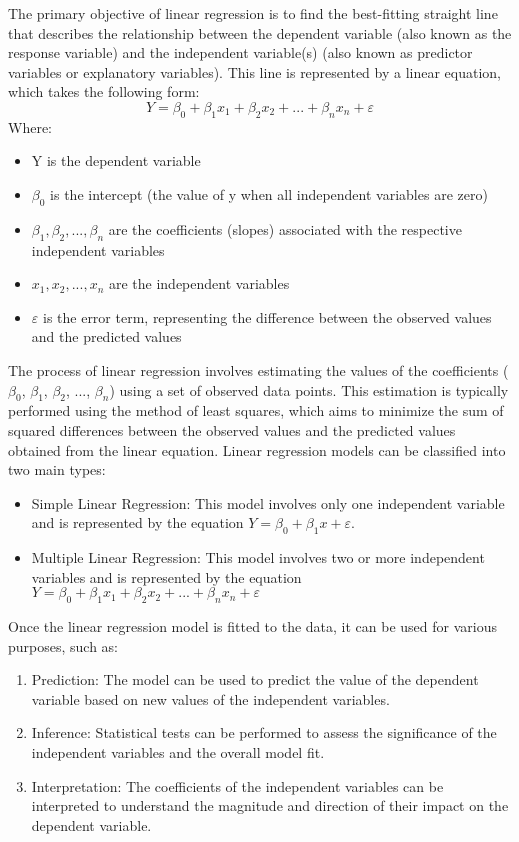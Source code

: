 The primary objective of linear regression is to find the best-fitting straight line that describes the relationship between the dependent variable (also known as the response variable) and the independent variable(s) (also known as predictor variables or explanatory variables). This line is represented by a linear equation, which takes the following form:
$$ Y = \beta_0 + \beta_1x_1 + \beta_2x_2 + ... + \beta_nx_n + \varepsilon  $$
Where:
\begin{itemize}
    \item Y is the dependent variable
    \item $ \beta_0 $ is the intercept (the value of y when all independent variables are zero)
    \item $ \beta_1,  \beta_2, ...,  \beta_n$ are the coefficients (slopes) associated with the respective independent variables
    \item $x_1, x_2, ..., x_n$ are the independent variables
    \item $\varepsilon$ is the error term, representing the difference between the observed values and the predicted values
\end{itemize}

\vspace*{1cm}

The process of linear regression involves estimating the values of the coefficients ($\beta_0$, $\beta_1$, $\beta_2$, ..., $\beta_n$) using a set of observed data points. This estimation is typically performed using the method of least squares, which aims to minimize the sum of squared differences between the observed values and the predicted values obtained from the linear equation.
Linear regression models can be classified into two main types:

\begin{itemize}
    \item Simple Linear Regression: This model involves only one independent variable and is represented by the equation $ Y = \beta_0 + \beta_1x + \varepsilon  $.
    \item Multiple Linear Regression: This model involves two or more independent variables and is represented by the equation $ Y = \beta_0 + \beta_1x_1 + \beta_2x_2 + ... + \beta_nx_n + \varepsilon  $
\end{itemize}

Once the linear regression model is fitted to the data, it can be used for various purposes, such as:

\begin{enumerate}
    \item Prediction: The model can be used to predict the value of the dependent variable based on new values of the independent variables.
    \item Inference: Statistical tests can be performed to assess the significance of the independent variables and the overall model fit.
    \item Interpretation: The coefficients of the independent variables can be interpreted to understand the magnitude and direction of their impact on the dependent variable.
\end{enumerate}

